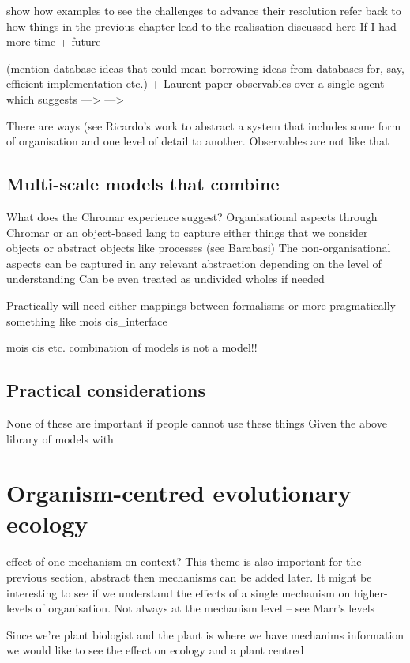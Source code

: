 \documentclass[phd]{infthesis}
\begin{document}
show how examples to see the challenges to advance their resolution
refer back to how things in the previous chapter lead to the realisation
discussed here
If I had more time + future

(mention database ideas that could mean borrowing ideas from databases for, say,
efficient implementation etc.)
+ Laurent paper
observables over a single agent
which suggests --->
--->

There are ways (see Ricardo's work to abstract a system that includes some form
of organisation and one level of detail to another.
Observables are not like that


\subsection{Multi-scale models that combine}
What does the Chromar experience suggest?
Organisational aspects through Chromar or an object-based lang to capture either
things that we consider objects or abstract objects like processes (see
Barabasi)
The non-organisational aspects can be captured in any relevant abstraction
depending on the level of understanding Can be even treated as undivided wholes
if needed

Practically will need either mappings between formalisms or more pragmatically
something like mois cis\_interface

mois cis etc. combination of models is not a model!!


\subsection{Practical considerations}
None of these are important if people cannot use these things
Given the above library of models with 



\section{Organism-centred evolutionary ecology}
effect of one mechanism on context? This theme is also important for the
previous section, abstract then mechanisms can be added later. It might be
interesting to see if we understand the effects of a single mechanism on
higher-levels of organisation.
Not always at the mechanism level -- see Marr's levels

Since we're plant biologist and the plant is where we have mechanims information
we would like to see the effect on ecology and a plant centred
\end{document}
